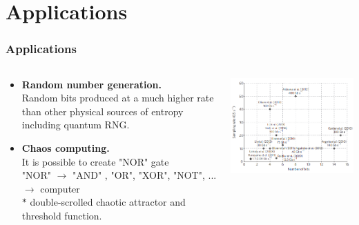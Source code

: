 \section{Applications}



\begin{frame}
\frametitle{Applications}
\begin{columns}
\begin{column}{0.5\linewidth}       
\begin{itemize}
\item \textbf{Random number generation.}    \\
Random bits produced at a much higher rate than other physical sources of entropy including quantum RNG.    
\item \textbf{Chaos computing.} \\
It is possible to create "NOR" gate\\
"NOR" $\to$ "AND" , "OR", "XOR", "NOT", ... $\to$ computer \\
$\ast$ double-scrolled chaotic attractor and threshold function. 
\end{itemize}
\end{column}
\begin{column}{0.5\linewidth}
    \includegraphics[width=\linewidth]{images/ChaosRNG.png}
\end{column}
\end{columns}
\end{frame}